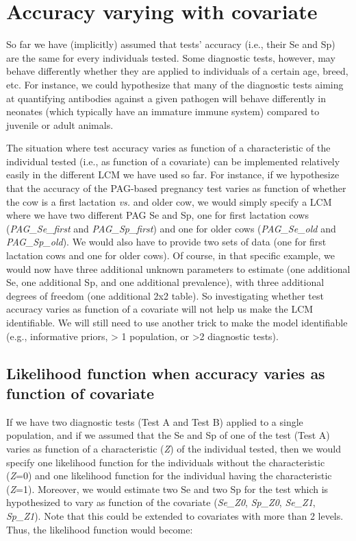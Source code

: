 \documentclass[
]{book}
\begin{document}
\chapter{Accuracy varying with covariate}\label{accuracy-varying-with-covariate}

So far we have (implicitly) assumed that tests' accuracy (i.e., their Se and Sp) are the same for every individuals tested. Some diagnostic tests, however, may behave differently whether they are applied to individuals of a certain age, breed, etc. For instance, we could hypothesize that many of the diagnostic tests aiming at quantifying antibodies against a given pathogen will behave differently in neonates (which typically have an immature immune system) compared to juvenile or adult animals.

The situation where test accuracy varies as function of a characteristic of the individual tested (i.e., as function of a covariate) can be implemented relatively easily in the different LCM we have used so far. For instance, if we hypothesize that the accuracy of the PAG-based pregnancy test varies as function of whether the cow is a first lactation \emph{vs.} and older cow, we would simply specify a LCM where we have two different PAG Se and Sp, one for first lactation cows (\emph{PAG\_Se\_first} and \emph{PAG\_Sp\_first}) and one for older cows (\emph{PAG\_Se\_old} and \emph{PAG\_Sp\_old}). We would also have to provide two sets of data (one for first lactation cows and one for older cows). Of course, in that specific example, we would now have three additional unknown parameters to estimate (one additional Se, one additional Sp, and one additional prevalence), with three additional degrees of freedom (one additional 2x2 table). So investigating whether test accuracy varies as function of a covariate will not help us make the LCM identifiable. We will still need to use another trick to make the model identifiable (e.g., informative priors, \textgreater{} 1 population, or \textgreater2 diagnostic tests).

\section{Likelihood function when accuracy varies as function of covariate}\label{likelihood-function-when-accuracy-varies-as-function-of-covariate}

If we have two diagnostic tests (Test A and Test B) applied to a single population, and if we assumed that the Se and Sp of one of the test (Test A) varies as function of a characteristic (\emph{Z}) of the individual tested, then we would specify one likelihood function for the individuals without the characteristic (\emph{Z}=0) and one likelihood function for the individual having the characteristic (\emph{Z}=1). Moreover, we would estimate two Se and two Sp for the test which is hypothesized to vary as function of the covariate (\emph{Se\_Z0}, \emph{Sp\_Z0}, \emph{Se\_Z1}, \emph{Sp\_Z1}). Note that this could be extended to covariates with more than 2 levels. Thus, the likelihood function would become:
\end{document}
